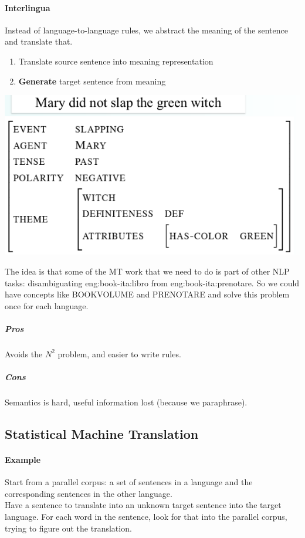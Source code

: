 \documentclass[10pt]{report}
\begin{document}
\paragraph{Interlingua} Instead of language-to-language rules, we abstract the meaning of the sentence and translate that.\begin{enumerate}
	\item Translate source sentence into meaning representation
	\item \textbf{Generate} target sentence from meaning
\end{enumerate}
\begin{center}
	\includegraphics[scale=0.5]{62.png}
\end{center}
The idea is that some of the MT work that we need to do is part of other NLP tasks: disambiguating eng:book-ita:libro from eng:book-ita:prenotare. So we could have concepts like BOOKVOLUME and PRENOTARE and solve this problem once for each language.
\subparagraph{Pros} Avoids the $N^2$ problem, and easier to write rules.
\subparagraph{Cons} Semantics is hard, useful information lost (because we paraphrase).

\subsection{Statistical Machine Translation}
\paragraph{Example} Start from a parallel corpus: a set of sentences in a language and the corresponding sentences in the other language.\\
Have a sentence to translate into an unknown target sentence into the target language. For each word in the sentence, look for that into the parallel corpus, trying to figure out the translation. 	
\end{document}
